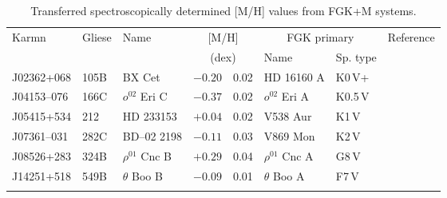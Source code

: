\documentclass{aa}
\begin{document}
\begin{table*}[]
\caption{Transferred spectroscopically determined [M/H] values from FGK+M systems.}
\label{tab:binaries_zeta}
\centering %
\begin{tabular}{lll r@{\,$\pm$\,}l lll}
    \hline 
    \hline 
    \noalign{\smallskip}
    Karmn     & Gliese   & Name           &  \multicolumn{2}{c}{{[}M/H{]}} & \multicolumn{2}{c}{FGK primary} &  Reference \\
     & & & \multicolumn{2}{c}{(dex)} & Name & Sp. type & \\
    \noalign{\smallskip}
    \hline 
    \noalign{\smallskip}
    J02362+068 & 105B  & BX Cet            & $-0.20$ & 0.02 & HD 16160 A & K0\,V+ & \citet{Montes2018} \\
    J04153--076 & 166C  & $o^{02}$ Eri C    & $-0.37$ & 0.02 & $o^{02}$ Eri A & K0.5\,V &  \citet{Montes2018}\\
    J05415+534 & 212   & HD 233153         & $+0.04$ & 0.02 & V538 Aur & K1\,V & \citet{Montes2018} \\
    J07361--031 & 282C  & BD--02 2198        & $-0.11$ & 0.03 & V869 Mon & K2\,V & \citet{Montes2018} \\
    J08526+283 & 324B  & $\rho^{01}$ Cnc B & $+0.29$ & 0.04 & $\rho^{01}$ Cnc A & G8\,V & \citet{Montes2018} \\
    J14251+518 & 549B  & $\theta$ Boo B    & $-0.09$ & 0.01 & $\theta$ Boo A & F7\,V & \cite{Tabernero2022} \\
    \noalign{\smallskip}
    \hline
\end{tabular}%
\end{table*}
\end{document}
